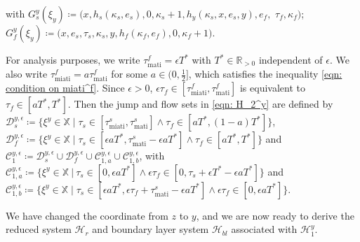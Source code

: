 with $G_s^y(\xi_y) \coloneqq \big(x, h_s(\kappa_s, e_s), 0, \kappa_s + 1, h_y(\kappa_s,x,e_s,y),  e_f,$ $ \tau_f, \kappa_f \big)$; $G_f^y(\xi_y) \coloneqq \big(x,e_s, \tau_s, \kappa_s , y, h_f(\kappa_f, e_f), 0, \kappa_f + 1 \big)$. 



For analysis purposes, we write $\tau_{\text{mati}}^f = \epsilon T^*$ with $T^* \in \mathbb{R}_{>0}$ independent of $\epsilon$. We also write $\tau_{\text{miati}}^f = a\tau_{\text{mati}}^f$ for some $a \in(0,\tfrac{1}{2}] $, which satisfies the inequality \eqref{eqn: condition on miati^f}. Since $\epsilon > 0$, $\epsilon \tau_f \in [\tau_{\text{miati}}^f, \tau_{\text{mati}}^f]$ is equivalent to $\tau_f \in [aT^*,T^*]$. Then the jump and flow sets in \eqref{eqn: H_2^y} are defined by
$\mathcal{D}_s^{y,\epsilon} \coloneqq  \{\xi^y \in \mathbb{X} \; | \; \tau_s \in [\tau_{\text{miati}}^s, \tau_{\text{mati}}^s] \wedge \tau_f \in  [aT^*, (1-a)T^*] \}$, 
$\mathcal{D}_f^{y,\epsilon} \coloneqq \{\xi^y \in \mathbb{X} \; | \; \tau_s \in [\epsilon aT^*, \tau_{\text{mati}}^s-\epsilon aT^*]  \wedge  \tau_f \in  [aT^*, T^*]  \}$ 
and
%
$\mathcal{C}_1^{y,\epsilon} \coloneqq 
        \mathcal{D}_s^{y,\epsilon} \cup \mathcal{D}_f^{y,\epsilon} \cup \mathcal{C}_{1,a}^{y,\epsilon} \cup \mathcal{C}_{1,b}^{y,\epsilon}$,
with $\mathcal{C}_{1,a}^{y,\epsilon} \coloneqq \{ \xi^y \in \mathbb{X} \ | \ \tau_s \in [0, \epsilon a T^*]  \wedge \epsilon \tau_f \in [0,\tau_s + \epsilon T^* - \epsilon a T^*] \} $ and 
$\mathcal{C}_{1,b}^{y,\epsilon} \coloneqq \{ \xi^y \in \mathbb{X} \;|\; \tau_s \in [\epsilon a T^*, \epsilon \tau_f + \tau_{\text{mati}}^s - \epsilon a T^*]  \wedge \epsilon \tau_f \in  [0, \epsilon a T^*]  \}$. 



%
%
We have changed the coordinate from $z$ to $y$, and we are now ready to derive the reduced system $\mathcal{H}_r$ and boundary layer system $\mathcal{H}_{bl}$ associated with $\mathcal{H}_1^y$.



